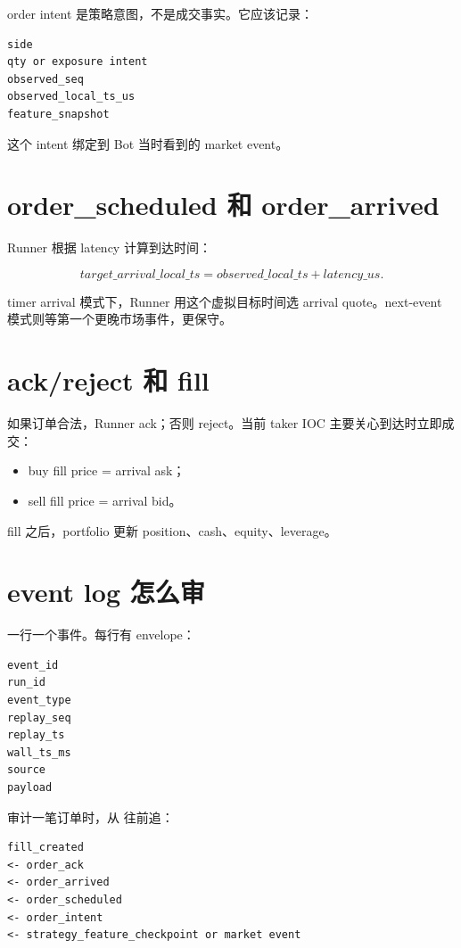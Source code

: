 order intent 是策略意图，不是成交事实。它应该记录：

\begin{lstlisting}
side
qty or exposure intent
observed_seq
observed_local_ts_us
feature_snapshot
\end{lstlisting}

这个 intent 绑定到 Bot 当时看到的 market event。

\section{order\_scheduled 和 order\_arrived}

Runner 根据 latency 计算到达时间：

\[
target\_arrival\_local\_ts
=observed\_local\_ts+latency\_us.
\]

timer arrival 模式下，Runner 用这个虚拟目标时间选 arrival quote。next-event 模式则等第一个更晚市场事件，更保守。

\section{ack/reject 和 fill}

如果订单合法，Runner ack；否则 reject。当前 taker IOC 主要关心到达时立即成交：

\begin{itemize}[leftmargin=2em]
  \item buy fill price = arrival ask；
  \item sell fill price = arrival bid。
\end{itemize}

fill 之后，portfolio 更新 position、cash、equity、leverage。

\section{event log 怎么审}

 一行一个事件。每行有 envelope：

\begin{lstlisting}
event_id
run_id
event_type
replay_seq
replay_ts
wall_ts_ms
source
payload
\end{lstlisting}

审计一笔订单时，从  往前追：

\begin{lstlisting}
fill_created
<- order_ack
<- order_arrived
<- order_scheduled
<- order_intent
<- strategy_feature_checkpoint or market event
\end{lstlisting}

